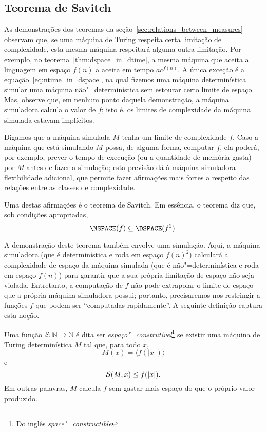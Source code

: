 \subsection{Teorema de Savitch}

As demonstrações dos teoremas da seção~\ref{sec:relations_between_measures}
observam que,
se uma máquina de Turing respeita certa limitação de complexidade,
esta mesma máquina respeitará alguma outra limitação.
Por exemplo, no teorema~\ref{thm:dspace_in_dtime},
a mesma máquina que aceita a linguagem em espaço $f(n)$
a aceita em tempo $a c^{f(n)}$.
A única exceção é a equação~\ref{eq:ntime_in_dspace},
na qual fizemos uma máquina determinística simular uma máquina não"=determinística
sem estourar certo limite de espaço.
Mas, observe que, em nenhum ponto daquela demonstração,
a máquina simuladora calcula o valor de $f$;
isto é, os limites de complexidade da máquina simulada estavam implícitos.

Digamos que a máquina simulada $M$ tenha um limite de complexidade $f$.
Caso a máquina que está simulando $M$ possa, de alguma forma,
computar $f$,
ela poderá, por exemplo,
prever o tempo de execução (ou a quantidade de memória gasta) por $M$
antes de fazer a simulação;
esta previsão dá à máquina simuladora flexibilidade adicional,
que permite fazer afirmações mais fortes
a respeito das relações entre as classes de complexidade.

Uma destas afirmações é o teorema de Savitch.
Em essência, o teorema diz que,
sob condições apropriadas,
\begin{equation*}
    \NSPACE(f) \subseteq \DSPACE(f^2).
\end{equation*}

A demonstração deste teorema também envolve uma simulação.
Aqui, a máquina simuladora
(que é determinística e roda em espaço $f(n)^2$)
calculará a complexidade de espaço da máquina simulada
(que é não"=determinística e roda em espaço $f(n)$)
para garantir que a sua própria limitação de espaço não seja violada.
Entretanto,
a computação de $f$ não pode extrapolar o limite de espaço
que a própria máquina simuladora possui;
portanto,
precisaremos nos restringir a funções $f$
que podem ser ``computadas rapidamente''.
A seguinte definição captura esta noção.

\begin{definition}
    Uma função $S: \mathbb N \to \mathbb N$
    é dita ser \emph{espaço"=construtível}\footnote{
        Do inglês \emph{space"=constructible}
    }
    se existir uma máquina de Turing determinística $M$
    tal que, para todo $x$,
    \begin{equation*}
        M(x) = \langle f(|x|) \rangle
    \end{equation*}
    e
    \begin{equation*}
        {\mathcal{S}}(M, x) \leq f(|x|).
    \end{equation*}
    Em outras palavras,
    $M$ calcula $f$
    sem gastar mais espaço do que o próprio valor produzido.
    \cite[p.~79]{AroraBarak2009}
\end{definition}

